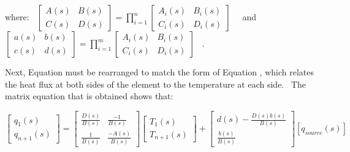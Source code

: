 where:~ \(\left[ {\begin{array}{*{20}{c}}{A\left( s \right)}&{B\left( s \right)}\\ {C\left( s \right)}&{D\left( s \right)}\end{array}} \right] = \prod\limits_{i = 1}^n {\left[ {\begin{array}{*{20}{c}}{{A_i}\left( s \right)}&{{B_i}\left( s \right)}\\ {{C_i}\left( s \right)}&{{D_i}\left( s \right)}\end{array}} \right]}\) ~~and~ \(\left[ {\begin{array}{*{20}{c}}{a\left( s \right)}&{b\left( s \right)}\\ {c\left( s \right)}&{d\left( s \right)}\end{array}} \right] = \prod\limits_{i = 1}^m {\left[ {\begin{array}{*{20}{c}}{{A_i}\left( s \right)}&{{B_i}\left( s \right)}\\ {{C_i}\left( s \right)}&{{D_i}\left( s \right)}\end{array}} \right]}\) ~.

Next, Equation must be rearranged to match the form of Equation , which relates the heat flux at both sides of the element to the temperature at each side.~ The matrix equation that is obtained shows that:

\begin{equation}
\left[ {\begin{array}{*{20}{c}}{{q_1}\left( s \right)}\\ {{q_{n + 1}}\left( s \right)}\end{array}} \right] = \left[ {\begin{array}{*{20}{c}}{\frac{{D\left( s \right)}}{{B\left( s \right)}}}&{\frac{{ - 1}}{{B\left( s \right)}}}\\ {\frac{1}{{B\left( s \right)}}}&{\frac{{ - A\left( s \right)}}{{B\left( s \right)}}}\end{array}} \right]\left[ {\begin{array}{*{20}{c}}{{T_1}\left( s \right)}\\ {{T_{n + 1}}\left( s \right)}\end{array}} \right] + \left[ {\begin{array}{*{20}{c}}{d\left( s \right) - \frac{{D\left( s \right)b\left( s \right)}}{{B\left( s \right)}}}\\ {\frac{{b\left( s \right)}}{{B\left( s \right)}}}\end{array}} \right]\left[ {{q_{source}}\left( s \right)} \right]
\end{equation}

